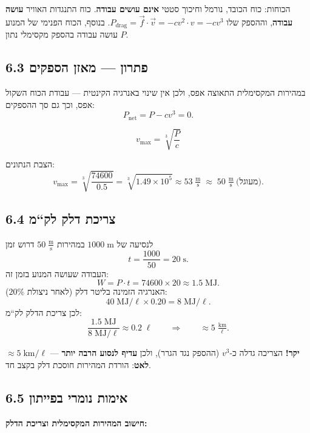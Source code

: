 \documentclass[12pt, a4paper]{article}
\newcommand{\hvec}[1]{\overrightarrow{#1}}
\begin{document}
הכוחות: כוח הכובד, נורמל וחיכוך סטטי \textbf{אינם עושים עבודה}. כוח התנגדות האוויר \textbf{עושה עבודה}, וההספק שלו \textenglish{$P_{\text{drag}} = \hvec{f}\cdot\hvec{v} = -c v^2 \cdot v = -c v^3$}. בנוסף, הכוח הפנימי של המנוע עושה עבודה בהספק מקסימלי נתון \textenglish{$P$}.

\subsection*{6.3 פתרון --- מאזן הספקים}

במהירות המקסימלית התאוצה אפס, ולכן אין שינוי באנרגיה הקינטית --- עבודת הכוח השקול אפס, וכך גם סך ההספקים:
\[
  P_{\text{net}} = P - c v^3 = 0 .
\]
\begin{tcolorbox}[resultbox, title={מהירות מקסימלית}]
\[
  v_{\max} = \sqrt[3]{\dfrac{P}{c}}
\]
\end{tcolorbox}

הצבת הנתונים:
\[
  v_{\max} = \sqrt[3]{\frac{74600}{0.5}}
           = \sqrt[3]{1.49\times10^{5}}
           \approx 53\;\tfrac{\text{m}}{\text{s}}
           \;\approx\; 50\;\tfrac{\text{m}}{\text{s}}\ \text{(מעוגל)}.
\]

\subsection*{6.4 צריכת דלק לק``מ}

לנסיעה של \textenglish{$1000\;\text{m}$} במהירות \textenglish{$50\;\tfrac{\text{m}}{\text{s}}$} דרוש זמן
\[
  t = \frac{1000}{50} = 20\;\text{s}.
\]
העבודה שעושה המנוע בזמן זה:
\[
  W = P\cdot t = 74600 \times 20 \approx 1.5\;\text{MJ}.
\]
האנרגיה הזמינה בליטר דלק (לאחר ניצולת \textenglish{$20\%$}):
\[
  40\;\text{MJ}/\ell \times 0.20 = 8\;\text{MJ}/\ell .
\]
לכן צריכת הדלק לק``מ:
\[
  \frac{1.5\;\text{MJ}}{8\;\text{MJ}/\ell} \approx 0.2\;\ell
  \qquad\Longrightarrow\qquad
  \approx 5\;\tfrac{\text{km}}{\ell}.
\]

\begin{tcolorbox}[warnbox, title={המסקנה}]
\textenglish{$\approx 5\;\text{km}/\ell$} --- \textbf{יקר!} הצריכה גדלה כ-\textenglish{$v^3$} (ההספק נגד הגרר), ולכן \textbf{עדיף לנסוע הרבה יותר לאט}: הורדת המהירות חוסכת דלק בקצב חד.
\end{tcolorbox}

\subsection*{6.5 אימות נומרי בפייתון}

\noindent\textbf{חישוב המהירות המקסימלית וצריכת הדלק:}
\end{document}
